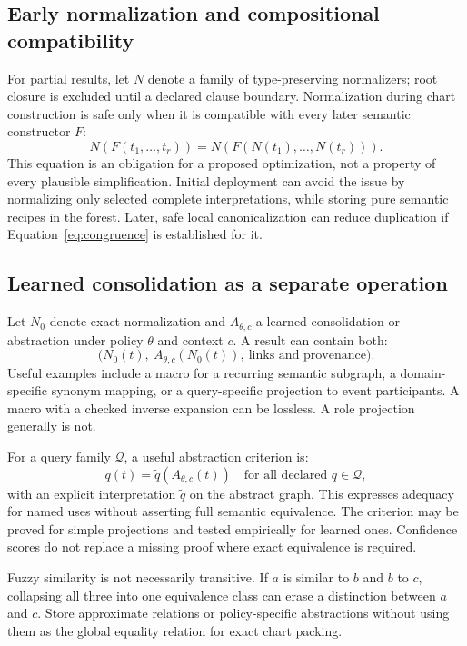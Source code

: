 \documentclass[11pt,a4paper]{article}
\begin{document}
\subsection{Early normalization and compositional compatibility}
For partial results, let \(N\) denote a family of type-preserving normalizers;
root closure is excluded until a declared clause boundary. Normalization
during chart construction is safe only when it is compatible
with every later semantic constructor \(F\):
\begin{equation}
 N(F(t_1,\ldots,t_r))
  =N(F(N(t_1),\ldots,N(t_r))).
 \label{eq:congruence}
\end{equation}
This equation is an obligation for a proposed optimization, not a property
of every plausible simplification. Initial deployment can avoid the issue by
normalizing only selected complete interpretations, while storing pure
semantic recipes in the forest. Later, safe local canonicalization can reduce
duplication if Equation~\eqref{eq:congruence} is established for it.

\subsection{Learned consolidation as a separate operation}
Let \(N_0\) denote exact normalization and \(A_{\theta,c}\) a learned
consolidation or abstraction under policy \(\theta\) and context \(c\).
A result can contain both:
\[
  \bigl(N_0(t),\ A_{\theta,c}(N_0(t)),\ \text{links and provenance}\bigr).
\]
Useful examples include a macro for a recurring semantic subgraph, a
domain-specific synonym mapping, or a query-specific projection to event
participants. A macro with a checked inverse expansion can be lossless.
A role projection generally is not.

For a query family \(\mathcal Q\), a useful abstraction criterion is:
\[
   q(t)=\widetilde q(A_{\theta,c}(t))
   \quad\text{for all declared }q\in\mathcal Q,
\]
with an explicit interpretation \(\widetilde q\) on the abstract graph.
This expresses adequacy for named uses without asserting full semantic
equivalence. The criterion may be proved for simple projections and tested
empirically for learned ones. Confidence scores do not replace a missing
proof where exact equivalence is required.

Fuzzy similarity is not necessarily transitive. If \(a\) is similar to \(b\)
and \(b\) to \(c\), collapsing all three into one equivalence class can erase
a distinction between \(a\) and \(c\). Store approximate relations or
policy-specific abstractions without using them as the global equality
relation for exact chart packing.
\end{document}
